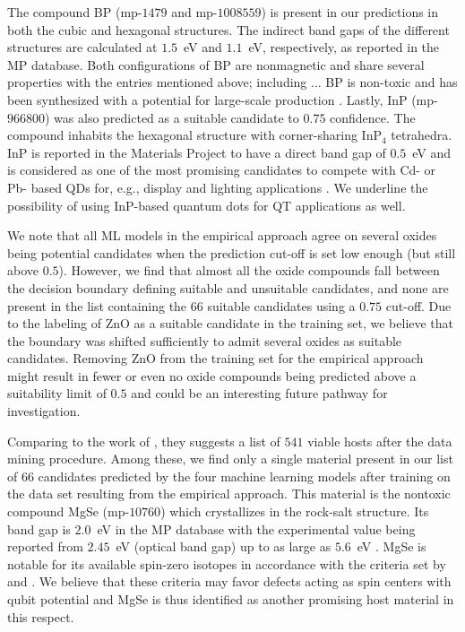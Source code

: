 \documentclass[superscriptaddress,unsortedaddress,
 amsmath,amssymb,
 aps,
]{revtex4-2}
\begin{document}
The compound BP (mp-$1479$ and mp-$1008559$) is present in our predictions in both the cubic and hexagonal structures. The indirect band gaps of the different structures are calculated at $1.5$~eV and $1.1$~eV, respectively, as reported in the MP database. Both configurations of BP are nonmagnetic and share several properties with the entries mentioned above; including ... BP is non-toxic and has been synthesized with a potential for large-scale production \cite{MukhanovVladimirA2016Umso}. 
Lastly, InP (mp-$966800$) was also predicted as a suitable candidate to $0.75$ confidence. The compound inhabits the hexagonal structure with corner-sharing InP$_4$ tetrahedra. InP is reported in the Materials Project to have a direct band gap of $0.5$~eV and is considered as one of the most promising candidates to compete with Cd- or Pb- based QDs for, e.g., display and lighting applications  \cite{Zhang2020a, Won2019}. 
We underline the possibility of using InP-based quantum dots for QT applications as well.  

We note that all ML models in the empirical approach agree on several oxides being potential candidates when the prediction cut-off is set low enough (but still above $0.5$). However, we find that almost all the oxide compounds fall between the decision boundary defining suitable and unsuitable candidates, and none are present in the list containing the $66$ suitable candidates using a $0.75$ cut-off. Due to the labeling of ZnO as a suitable candidate in the training set, we believe that the boundary was shifted sufficiently to admit several oxides as suitable candidates. 
Removing ZnO from the training set for the empirical approach might result in fewer or even no oxide compounds being predicted above a suitability limit of $0.5$ and could be an interesting future pathway for investigation. 


Comparing to the work of \citeauthor{Ferrenti2020} \cite{Ferrenti2020}, they suggests a list of $541$ viable hosts after the data mining procedure.  
Among these, we find only a single material present in our list of $66$ candidates predicted by the four machine learning models after training on the data set resulting from the empirical approach. This material is the nontoxic compound MgSe (mp-$10760$) which crystallizes in the rock-salt structure. Its band gap is $2.0$~eV in the MP database with the experimental value being reported from $2.45$~eV (optical band gap) \cite{Ubale2014} up to as large as $5.6$~eV \cite{SaumGeorge1959}. MgSe is notable for its available spin-zero isotopes in accordance with the criteria set by  \citeauthor{Weber2010} \cite{Weber2010} and \citeauthor{Ferrenti2020} \cite{Ferrenti2020}. We believe that these criteria may favor defects acting as spin centers with qubit potential and MgSe is thus identified as another promising host material in this respect.   
\end{document}
